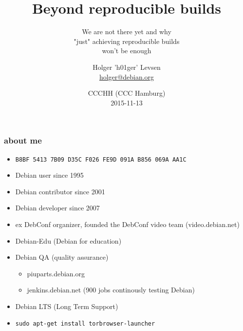 \documentclass[14pt,aspectratio=169]{beamer}
\title[Beyond Reproducible builds]{Beyond reproducible builds}
\subtitle{We are not there yet and why \\ "just" achieving reproducible builds
\\ won't be enough}
\author[h01ger]{%
   \texorpdfstring{
            \centering
            Holger 'h01ger' Levsen\\
            \href{mailto:holger@debian.org}{holger@debian.org}
   }{h01ger}}
\institute[Debian]{}
\date[CCCHH '15]{%
 CCCHH (CCC Hamburg)\\
 2015-11-13}
\begin{document}
\begin{frame}
 \titlepage
\end{frame}

\begin{frame}
 \frametitle{about me}

 \begin{itemize}
  \item \small{\texttt{B8BF 5413 7B09 D35C F026  FE9D 091A B856 069A AA1C}}
  \item Debian user since 1995
  \item Debian contributor since 2001
  \item Debian developer since 2007
  \item ex DebConf organizer, founded the DebConf video team (video.debian.net)
  \item Debian-Edu (Debian for education)
  \item Debian QA (quality assurance)
  \begin{itemize}
   \item piuparts.debian.org
   \item jenkins.debian.net (900 jobs continously testing Debian)
  \end{itemize}
  \item Debian LTS (Long Term Support)
  \item<2> \texttt{sudo apt-get install torbrowser-launcher}
 \end{itemize}
\end{frame}
\end{document}
